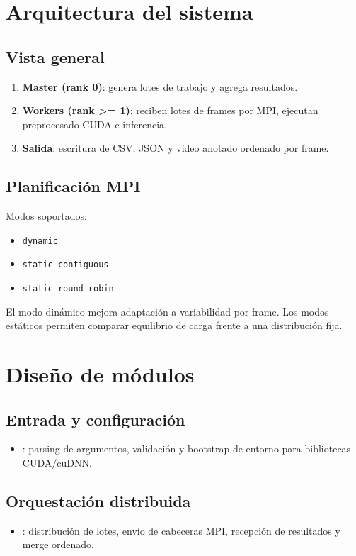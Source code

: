 \documentclass[11pt,a4paper]{article}
\begin{document}
\section{Arquitectura del sistema}
\subsection{Vista general}
\begin{enumerate}[leftmargin=*]
  \item \textbf{Master (rank 0)}: genera lotes de trabajo y agrega resultados.
  \item \textbf{Workers (rank >= 1)}: reciben lotes de frames por MPI, ejecutan preprocesado CUDA e inferencia.
  \item \textbf{Salida}: escritura de CSV, JSON y video anotado ordenado por frame.
\end{enumerate}

\subsection{Planificaci\'on MPI}
Modos soportados:
\begin{itemize}[leftmargin=*]
  \item \texttt{dynamic}
  \item \texttt{static-contiguous}
  \item \texttt{static-round-robin}
\end{itemize}

El modo din\'amico mejora adaptaci\'on a variabilidad por frame. Los modos est\'aticos permiten comparar equilibrio de carga frente a una distribuci\'on fija.

\section{Dise\~no de m\'odulos}
\subsection{Entrada y configuraci\'on}
\begin{itemize}[leftmargin=*]
  \item {}: parsing de argumentos, validaci\'on y bootstrap de entorno para bibliotecas CUDA/cuDNN.
\end{itemize}

\subsection{Orquestaci\'on distribuida}
\begin{itemize}[leftmargin=*]
  \item {}: distribuci\'on de lotes, env\'io de cabeceras MPI, recepci\'on de resultados y merge ordenado.
\end{itemize}
\end{document}
